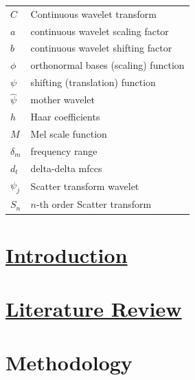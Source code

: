 \documentclass[12pt,twoside]{report}
\begin{document}
\begin{table}[tp]
\begin{tabular}{ll}
$C$ & Continuous wavelet transform \\
$a$ & continuous wavelet scaling factor \\
$b$ & continuous wavelet shifting factor \\
$\phi$ & orthonormal bases (scaling) function \\
$\psi$ & shifting (translation) function \\
$\hat{\psi}$ & mother wavelet \\
$h$ & Haar coefficients \\
$M$ & Mel scale function \\
$\delta_m$ & frequency range \\
$d_t$ & delta-delta \acrshort{mfcc}s \\
$\psi_j$ & Scatter transform wavelet \\
$S_n$ & $n$-th order Scatter transform \\
\end{tabular}
\end{table}

\chapter{\href{https://docs.google.com/document/d/1h8ZEcfEUpjJM6wYkgYYH-ryuiBFYVGSQA-Sf1StQtiY/edit#heading=h.i9tlo6ovvcpr}{Introduction}}\label{ch1_intro}


\chapter{\href{https://docs.google.com/document/d/1h8ZEcfEUpjJM6wYkgYYH-ryuiBFYVGSQA-Sf1StQtiY/edit#heading=h.i9tlo6ovvcpr}{Literature Review}}\label{c02}\label{ch2litrev}


\chapter{Methodology}\label{ch3Method}


\end{document}
